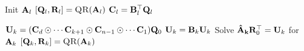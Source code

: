 \begin{algorithmic}[1]
      \State Init $\mathbf{A}_l$
      \State $[\mat{Q}_l,\mat{R}_l] = \Call{QR}{\mat{A}_l}$ 
        \State $\mathbf{C}_l = \mathbf{B}_l^\top\mathbf{Q}_l$  \label{l:EXP-K-Apply}

      \EndFor
      
      \State $\mathbf{U}_k = (\mathbf{C}_d \odot \cdots \mathbf{C}_{k+1} \odot \mathbf{C}_{n-1} \odot \cdots \mathbf{C}_1)\mathbf{Q}_0$ 
      \State $\mathbf{U}_k = \mathbf{B}_k\mathbf{U}_k$ 
      \State Solve $\mathbf{\hat{A}_k}\mathbf{R}_0^\top = \mathbf{U}_k$ for $\mathbf{A}_k$ 
      \State $[\mat{Q}_k,\mat{R}_k] = \Call{QR}{\mat{A}_k}$      
      \EndFor
      \EndWhile
    \EndFunction
  \end{algorithmic}